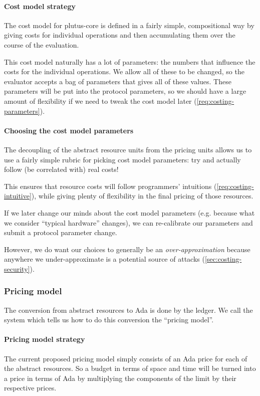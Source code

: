 \paragraph{Cost model strategy}
The cost model for \gls{plutus-core} is defined in a fairly simple, compositional way by giving costs for individual operations and then accumulating them over the course of the evaluation.

This cost model naturally has a lot of parameters: the numbers that influence the costs for the individual operations.
We allow all of these to be changed, so the evaluator accepts a bag of parameters that gives all of these values.
These parameters will be put into the protocol parameters, so we should have a large amount of flexibility if we need to tweak the cost model later (\cref{req:costing-parameters}).

\paragraph{Choosing the cost model parameters}
The decoupling of the abstract resource units from the pricing units allows us to use a fairly simple rubric for picking cost model parameters: try and actually follow (be correlated with) real costs!

This ensures that resource costs will follow programmers' intuitions (\cref{req:costing-intuitive}), while giving plenty of flexibility in the final pricing of those resources.

If we later change our minds about the cost model parameters (e.g. because what we consider ``typical hardware'' changes), we can re-calibrate our parameters and submit a protocol parameter change.

However, we do want our choices to generally be an \emph{over-approximation} because anywhere we under-approximate is a potential source of attacks (\cref{sec:costing-security}).

\subsubsection{Pricing model}
The conversion from abstract resources to Ada is done by the ledger.
We call the system which tells us how to do this conversion the ``pricing model''.

\paragraph{Pricing model strategy}
The current proposed pricing model simply consists of an Ada price for each of the abstract resources.
So a budget in terms of \gls{space} and \gls{time} will be turned into a price in terms of Ada by multiplying the components of the limit by their respective prices.

